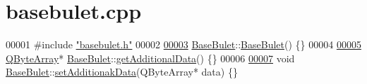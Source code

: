 \hypertarget{a00032_source}{}\section{basebulet.\+cpp}
\label{a00032_source}

\begin{DoxyCode}
00001 \textcolor{preprocessor}{#}\textcolor{preprocessor}{include} \hyperlink{a00035}{"basebulet.h"}
00002 
\hyperlink{a00153_abdfda473d6ddd2a2fb35783dfa5ef836}{00003} \hyperlink{a00153}{BaseBulet}::\hyperlink{a00153_abdfda473d6ddd2a2fb35783dfa5ef836}{BaseBulet}() \{\}
00004 
\hyperlink{a00153_a307a62b59328f9e2a0530f559aba0dcb}{00005} \hyperlink{a00153_a307a62b59328f9e2a0530f559aba0dcb}{QByteArray}* \hyperlink{a00153}{BaseBulet}::\hyperlink{a00153_a307a62b59328f9e2a0530f559aba0dcb}{getAdditionalData}() \{\}
00006 
\hyperlink{a00153_ae97774994602a89562688f97339b9eb3}{00007} \textcolor{keywordtype}{void} \hyperlink{a00153}{BaseBulet}::\hyperlink{a00153_ae97774994602a89562688f97339b9eb3}{setAdditionakData}(QByteArray* data) \{\}
\end{DoxyCode}
